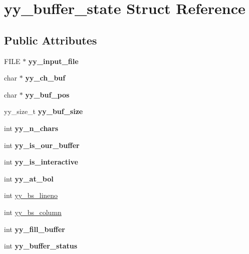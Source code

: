 \hypertarget{structyy__buffer__state}{}\section{yy\+\_\+buffer\+\_\+state Struct Reference}
\label{structyy__buffer__state}
\subsection*{Public Attributes}
\begin{DoxyCompactItemize}
\item 
\mbox{\label{structyy__buffer__state_a4843d1422e3276b636d475a3095bd948}} 
F\+I\+LE $\ast$ {\bfseries yy\+\_\+input\+\_\+file}
\item 
\mbox{\label{structyy__buffer__state_ad7b8df8d8a4688e57b0b8d3ca75adc85}} 
char $\ast$ {\bfseries yy\+\_\+ch\+\_\+buf}
\item 
\mbox{\label{structyy__buffer__state_a58aa927f098b99d99e75da80f9b681ef}} 
char $\ast$ {\bfseries yy\+\_\+buf\+\_\+pos}
\item 
\mbox{\label{structyy__buffer__state_a48302f5f3477a9c78bbddf56d356ef54}} 
yy\+\_\+size\+\_\+t {\bfseries yy\+\_\+buf\+\_\+size}
\item 
\mbox{\label{structyy__buffer__state_a06406208824817acfec2183b79080945}} 
int {\bfseries yy\+\_\+n\+\_\+chars}
\item 
\mbox{\label{structyy__buffer__state_a80ce2431c70dc4f89ced487f18449465}} 
int {\bfseries yy\+\_\+is\+\_\+our\+\_\+buffer}
\item 
\mbox{\label{structyy__buffer__state_abf5c70eea75581b58c0ee7bd31b14490}} 
int {\bfseries yy\+\_\+is\+\_\+interactive}
\item 
\mbox{\label{structyy__buffer__state_a9d60c60af6e1a6f69de16871fd64f85f}} 
int {\bfseries yy\+\_\+at\+\_\+bol}
\item 
int \hyperlink{structyy__buffer__state_a818e94bc9c766e683c60df1e9fd01199}{yy\+\_\+bs\+\_\+lineno}
\item 
int \hyperlink{structyy__buffer__state_a10c4fcd8be759e6bf11e6d3e8cdb0307}{yy\+\_\+bs\+\_\+column}
\item 
\mbox{\label{structyy__buffer__state_a63d2afbb1d79a3fc63df9e12626f827d}} 
int {\bfseries yy\+\_\+fill\+\_\+buffer}
\item 
\mbox{\label{structyy__buffer__state_a70fd925d37a2f0454fbd0def675d106c}} 
int {\bfseries yy\+\_\+buffer\+\_\+status}
\end{DoxyCompactItemize}


